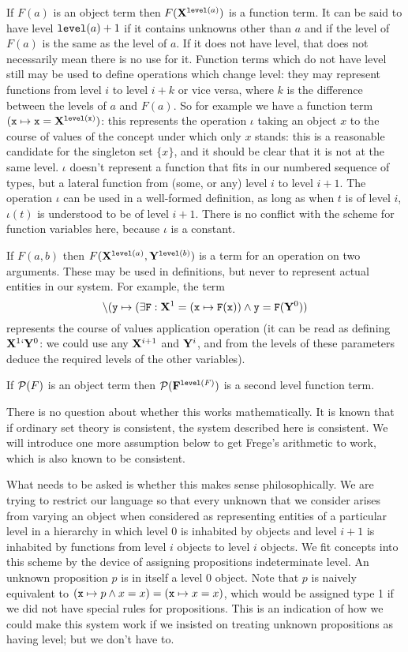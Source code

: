 \documentclass[12pt]{article}
\begin{document}
If $F(a)$ is an object term then $F({\bf X}^{{\tt level}(a)})$ is a function term.  It can be said to have level ${\tt level}(a)+1$ if it contains unknowns other than $a$ and if the level of
$F(a)$ is the same as the level of $a$.  If it does not have level, that does not necessarily mean there is no use for it.   Function terms which do not have level still may be used
to define operations which change level:  they may represent functions from level $i$ to level $i+k$ or vice versa, where $k$ is the difference between the levels of $a$ and $F(a)$.
So for example we have a function term $({\tt x} \mapsto {\tt x} = {\bf X}^{{\tt level}({\tt x})})$:  this represents the operation $\iota$ taking an object $x$ to the course of values of the concept under which only $x$ stands:  this is a reasonable candidate for the singleton set $\{x\}$, and it should be clear that it is not at the same level.  $\iota$ doesn't represent a function that fits in our numbered sequence of types, but
a lateral function from (some, or any) level $i$ to level $i+1$.  The operation $\iota$ can be used in a well-formed definition, as long as when $t$ is of level $i$, $\iota(t)$ is understood to be of level $i+1$.  There is no conflict with the scheme for function variables here, because $\iota$ is a constant.

If $F(a,b)$ then $F({\bf X}^{{\tt level}(a)},{\bf Y}^{{\tt level}(b)})$ is a term for an operation on two arguments.  These may be used in definitions, but never to represent actual entities in our system.
For example, the term $$\backslash({\tt y}\mapsto (\exists {\tt F}: {\bf X}^1 = ({\tt x} \mapsto {\tt F}({\tt x})) \wedge {\tt y} = {\tt F}({\bf Y}^0))$$ represents the course of values application operation
(it can be read as defining ${\bf X}^1`{\bf Y}^0$:  we could use any ${\bf X}^{i+1}$ and ${\bf Y}^i$, and from the levels of these parameters deduce the required levels of the other variables).


If ${\cal P}(F)$ is an object term then ${\cal P}({\bf F}^{{\tt level}(F)})$ is a second level function term.

There is no question about whether this works mathematically.  It is known that if ordinary set theory is consistent, the system described here is consistent.  We will introduce one more assumption below
to get Frege's arithmetic to work, which is also known to be consistent.

What needs to be asked is whether this makes sense philosophically.  We are trying to restrict our language so that every unknown that we consider arises from varying an object when considered as representing
entities  of a particular level in a hierarchy in which level 0 is inhabited by objects and level $i+1$ is inhabited by functions from level $i$ objects to level $i$ objects.  We fit concepts into this scheme by the
device of assigning propositions indeterminate level.  An unknown proposition $p$ is in itself a level 0 object.  Note that $p$ is naively equivalent to $({\tt x} \mapsto p \wedge x=x)=({\tt x} \mapsto x=x)$, which would be assigned type 1 if we did not have special rules for propositions.  This is an indication of how we could make this system work if we insisted on treating unknown propositions as having level;  but we don't have to.
\end{document}
